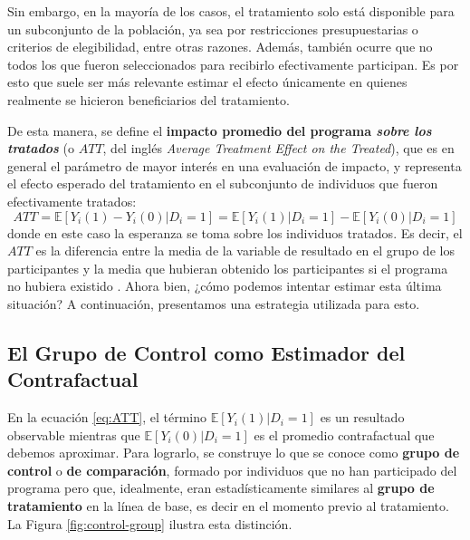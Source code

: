 \documentclass[../../main.tex]{subfiles}
\begin{document}
Sin embargo, en la mayoría de los casos, el tratamiento solo está disponible para un
subconjunto de la población, ya sea por restricciones presupuestarias o criterios de
elegibilidad, entre otras razones. Además, también ocurre que no todos los que fueron
seleccionados para recibirlo efectivamente participan. Es por esto que suele ser más
relevante estimar el efecto únicamente en quienes realmente se hicieron beneficiarios del
tratamiento.

De esta manera, se define el \textbf{impacto promedio del programa \textit{sobre los
tratados}} (o \(ATT\), del inglés \textit{Average Treatment Effect on the Treated}), que
es en general el parámetro de mayor interés en una evaluación de impacto, y representa el
efecto esperado del tratamiento en el subconjunto de individuos que fueron efectivamente
tratados:
\begin{equation}
    ATT = \mathbb{E} \left[Y_i(1)-Y_i(0)|D_i=1\right] = \mathbb{E} \left[Y_i(1)|D_i=1\right] -
    \mathbb{E} \left[Y_i(0)|D_i=1\right]
    \label{eq:ATT}
\end{equation}
donde en este caso la esperanza se toma sobre los individuos tratados. Es decir, el
\(ATT\) es la diferencia entre la media de la variable de resultado en el grupo de los
participantes y la media que hubieran obtenido los participantes si el programa no hubiera
existido \cite{bernal}. Ahora bien, ¿cómo podemos intentar estimar esta última situación?
A continuación, presentamos una estrategia utilizada para esto.

\subsection{El Grupo de Control como Estimador del Contrafactual}
En la ecuación \ref{eq:ATT}, el término \(\mathbb{E} \left[Y_i(1)|D_i=1\right]\) es un
resultado observable mientras que \(\mathbb{E} \left[Y_i(0)|D_i=1\right]\) es el promedio
contrafactual que debemos aproximar. Para lograrlo, se construye lo que se conoce como
\textbf{grupo de control} o \textbf{de comparación}, formado por individuos que no han
participado del programa pero que, idealmente, eran estadísticamente similares
\cite{gertler-2016} al \textbf{grupo de tratamiento} en la línea de base, es decir en el
momento previo al tratamiento. La Figura \ref{fig:control-group} ilustra esta distinción.
\end{document}
